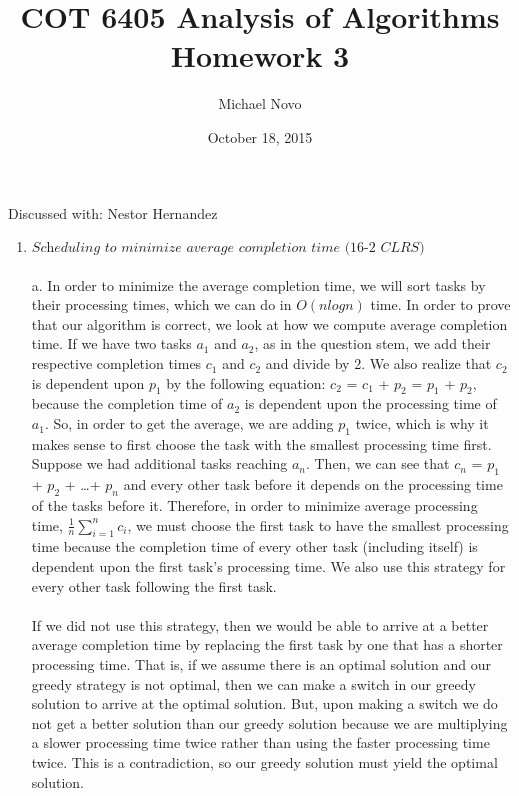 \documentclass[]{report}
\title{COT 6405 Analysis of Algorithms \\ Homework 3}
\author{Michael Novo}
\date{October 18, 2015}
\begin{document}
	\maketitle
	
	Discussed with: Nestor Hernandez
	
\begin{enumerate}
	\item $ \textit{Scheduling to minimize average completion time (16-2 CLRS)} $
	\\
	\\
	a. In order to minimize the average completion time, we will sort tasks by their processing times, which we can do in $ O(n logn) $ time. In order to prove that our algorithm is correct, we look at how we compute average completion time. If we have two tasks $ a_{1} $ and $ a_{2} $, as in the question stem, we add their respective completion times $ c_{1} $ and $ c_{2} $ and divide by 2. We also realize that $ c_{2} $ is dependent upon $  p_{1} $ by the following equation: $ c_{2} $ = $ c_{1} $ + $ p_{2} $  =  $ p_{1} $ + $ p_{2} $, because the completion time of $ a_{2} $ is dependent upon the processing time of $ a_{1} $. So, in order to get the average, we are adding $ p_{1} $ twice, which is why it makes sense to first choose the task with the smallest processing time first. Suppose we had additional tasks reaching $ a_{n} $. Then, we can see that $ c_{n} $ = $ p_{1} $ + $ p_{2} $ + \dots + $ p_{n} $ and every other task before it depends on the processing time of the tasks before it. Therefore, in order to minimize average processing time, $ \frac{1}{n}\sum_{i=1}^{n}c_{i} $, we must choose the first task to have the smallest processing time because the completion time of every other  task (including itself) is dependent upon the first task's processing time. We also use this strategy for every other task following the first task. 
	\\ 
	\\
	If we did not use this strategy, then we would be able to arrive at a better average completion time by  replacing the first task by one that has a shorter processing time. That is, if we assume there is an optimal solution and our greedy strategy is not optimal, then we can make a switch in our greedy solution to arrive at the optimal solution. But, upon making a switch we do not get a better solution than our greedy solution because we are multiplying a slower processing time twice rather than using the faster processing time twice. This is a contradiction, so our greedy solution must yield the optimal solution. 

\end{enumerate}
\end{document}
